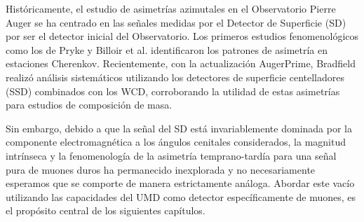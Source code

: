 Históricamente, el estudio de asimetrías azimutales en el Observatorio Pierre Auger se ha centrado en las señales medidas por el Detector de Superficie (SD) por ser el detector inicial del Observatorio. Los primeros estudios fenomenológicos como los de Pryke \cite{Pryke1998} y Billoir et al. \cite{Billoir2002} identificaron los patrones de asimetría en estaciones Cherenkov. Recientemente, con la actualización AugerPrime, Bradfield \cite{BradfieldThesis} realizó análisis sistemáticos utilizando los detectores de superficie centelladores (SSD) combinados con los WCD, corroborando la utilidad de estas asimetrías para estudios de composición de masa.

Sin embargo, debido a que la señal del SD está invariablemente dominada por la componente electromagnética a los ángulos cenitales considerados, la magnitud intrínseca y la fenomenología de la asimetría temprano-tardía para una señal pura de muones duros ha permanecido inexplorada y no necesariamente esperamos que se comporte de manera estrictamente análoga. Abordar este vacío utilizando las capacidades del UMD como detector específicamente de muones, es el propósito central de los siguientes capítulos.

\newpage
